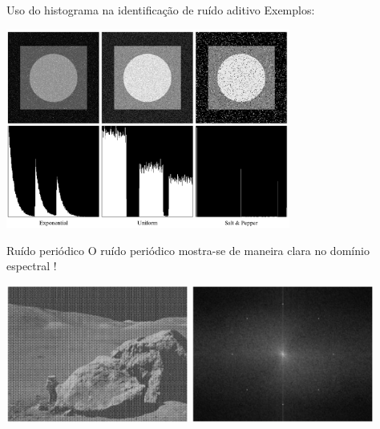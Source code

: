 \begin{slide}[toc=]{Uso do histograma na identificação de ruído aditivo}
Exemplos:
	\begin{center}
		\includegraphics[width=0.7\textwidth]{figs/5-04b}
	\end{center}
\end{slide}
      
\begin{slide}[toc=]{Ruído periódico}
O ruído periódico mostra-se de maneira clara no domínio espectral !
	\begin{center}
		\includegraphics[width=0.45\textwidth]{figs/5-05a}
		\includegraphics[width=0.45\textwidth]{figs/5-05b}
	\end{center}
\end{slide}

